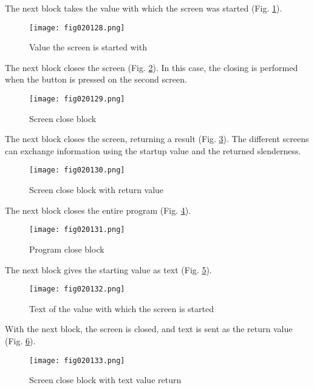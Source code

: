 The next block takes the value with which the screen was started (Fig. \ref{fig020128}).

\begin{figure}[H]
   \centering
   \texttt{[image: fig020128.png]}
   \caption{Value the screen is started with}
\label{fig020128}
\end{figure}

The next block closes the screen (Fig. \ref{fig020129}). In this case, the closing is performed when the button is pressed on the second screen.

\begin{figure}[H]
   \centering
   \texttt{[image: fig020129.png]}
   \caption{Screen close block}
\label{fig020129}
\end{figure}

The next block closes the screen, returning a result (Fig. \ref{fig020130}). The different screens can exchange information using the startup value and the returned slenderness.

\begin{figure}[H]
   \centering
   \texttt{[image: fig020130.png]}
   \caption{Screen close block with return value}
\label{fig020130}
\end{figure}

The next block closes the entire program (Fig. \ref{fig020131}).

\begin{figure}[H]
   \centering
   \texttt{[image: fig020131.png]}
   \caption{Program close block}
\label{fig020131}
\end{figure}

The next block gives the starting value as text (Fig. \ref{fig020132}).

\begin{figure}[H]
   \centering
   \texttt{[image: fig020132.png]}
   \caption{Text of the value with which the screen is started}
\label{fig020132}
\end{figure}

With the next block, the screen is closed, and text is sent as the return value (Fig. \ref{fig020133}).

\begin{figure}[H]
   \centering
   \texttt{[image: fig020133.png]}
   \caption{Screen close block with text value return}
\label{fig020133}
\end{figure}

